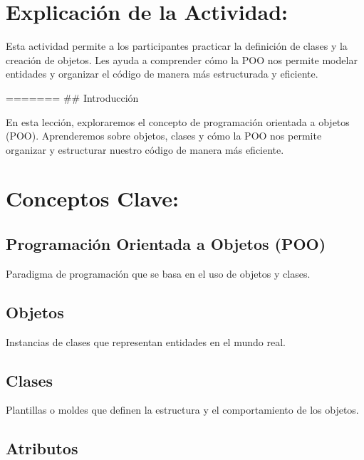 \documentclass[
  a4paper,
  onepage,
  openany]{scrreprt}
\begin{document}
\hypertarget{explicaciuxf3n-de-la-actividad-46}{%
\section{Explicación de la
Actividad:}\label{explicaciuxf3n-de-la-actividad-46}}

Esta actividad permite a los participantes practicar la definición de
clases y la creación de objetos. Les ayuda a comprender cómo la POO nos
permite modelar entidades y organizar el código de manera más
estructurada y eficiente.

======= \#\# Introducción

En esta lección, exploraremos el concepto de programación orientada a
objetos (POO). Aprenderemos sobre objetos, clases y cómo la POO nos
permite organizar y estructurar nuestro código de manera más eficiente.

\hypertarget{conceptos-clave-49}{%
\section{Conceptos Clave:}\label{conceptos-clave-49}}

\hypertarget{programaciuxf3n-orientada-a-objetos-poo-1}{%
\subsection{Programación Orientada a Objetos
(POO)}\label{programaciuxf3n-orientada-a-objetos-poo-1}}

Paradigma de programación que se basa en el uso de objetos y clases.

\hypertarget{objetos-1}{%
\subsection{Objetos}\label{objetos-1}}

Instancias de clases que representan entidades en el mundo real.

\hypertarget{clases-1}{%
\subsection{Clases}\label{clases-1}}

Plantillas o moldes que definen la estructura y el comportamiento de los
objetos.

\hypertarget{atributos-1}{%
\subsection{Atributos}\label{atributos-1}}
\end{document}
